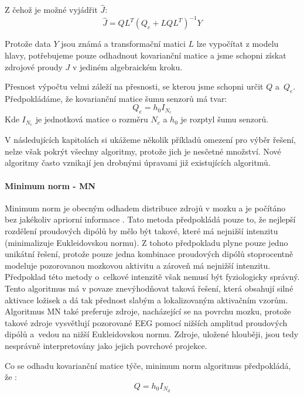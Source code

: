 Z čehož je možné vyjádřit $\hat{J}$:
\begin{equation}
\hat{J} = Q L^T (Q_e + LQL^T)^{-1} Y
\label{vyslednaRovnice}
\end{equation}

Protože data $Y$ jsou známá a transformační matici $L$ lze vypočítat z modelu hlavy, potřebujeme pouze odhadnout kovarianční matice a jsme schopni získat zdrojové proudy $J$ v jediném algebraickém kroku.

Přesnost výpočtu velmi záleží na přesnosti, se kterou jsme schopni určit $Q$ a~$Q_e$. Předpokládáme, že kovarianční matice šumu senzorů má tvar:
\begin{equation*}
Q_e=h_0 I_{N_c}
\end{equation*}
Kde $I_{N_c}$ je jednotková matice o rozměru $N_c$ a $h_0$ je rozptyl šumu senzorů. \cite{74}

V následujících kapitolách si ukážeme několik příkladů omezení pro výběr řešení, nelze však pokrýt všechny algoritmy, protože jich je nesčetné množství. Nové algoritmy často vznikají jen drobnými úpravami již existujících algoritmů.





\paragraph{Minimum norm - MN}
\label{minimumNorm}
Minimum norm je obecným odhadem distribuce zdrojů v mozku a je počítáno bez jakékoliv apriorní informace \cite{43}. Tato metoda předpokládá pouze to, že nejlepší rozdělení proudových dipólů by mělo být takové, které má nejnižší intenzitu (minimalizuje Eukleidovskou normu). Z tohoto předpokladu plyne pouze jedno unikátní řešení, protože pouze jedna kombinace proudových dipólů stoprocentně modeluje pozorovanou mozkovou aktivitu a zároveň má nejnižší intenzitu. Předpoklad této metody o~celkové intenzitě však nemusí být fyziologicky správný. Tento algoritmus má v povaze znevýhodňovat taková řešení, která obsahují silné aktivace ložisek a dá tak přednost slabým a lokalizovaným aktivačním vzorům. Algoritmus MN také preferuje zdroje, nacházející se na povrchu mozku, protože takové zdroje vysvětlují pozorované EEG pomocí nižších amplitud proudových dipólů a~vedou na nižší Eukleidovskou normu. Zdroje, uložené hlouběji, jsou tedy nesprávně interpretovány jako jejich povrchové projekce.  \cite{29} 

Co se odhadu kovarianční matice týče, minimum norm algoritmus předpokládá, že \cite{74}:
\begin{equation}
Q = h_0 I_{N_d}
\end{equation}

